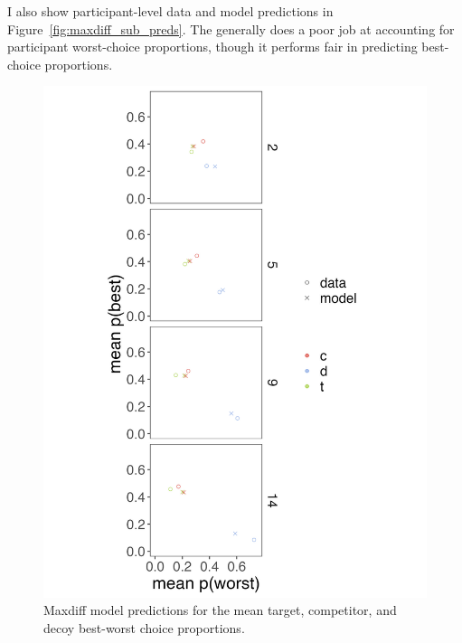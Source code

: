 I also show participant-level data and model predictions in Figure~\ref{fig:maxdiff_sub_preds}. The generally does a poor job at accounting for participant worst-choice proportions, though it performs fair in predicting best-choice proportions. 
\begin{figure}
   \includegraphics[width=\linewidth]{figures/maxdiff_2_means_model_v_data.jpeg}
   \caption{Maxdiff model predictions for the mean target, competitor, and decoy best-worst choice proportions.}
   \label{fig:maxdiff_collapsed_preds}
\end{figure}

